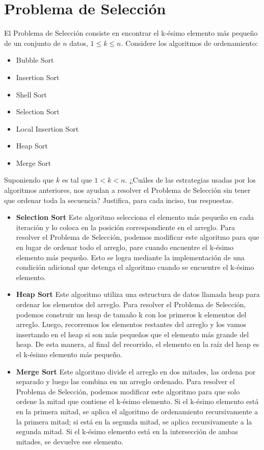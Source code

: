 \section{Problema de Selección}

El Problema de Selección consiste en encontrar el k-ésimo elemento más
pequeño de un conjunto de $n$ datos, $1 \leq k \leq n$.
Considere los algoritmos de ordenamiento:

\begin{itemize}
  \item Bubble Sort
  \item Insertion Sort
  \item Shell Sort
  \item Selection Sort
  \item Local Insertion Sort
  \item Heap Sort
  \item Merge Sort
\end{itemize}

Suponiendo que $k$ es tal que $1 < k < n$. ¿Cuáles de las
estrategias usadas por los algoritmos anteriores, nos ayudan a resolver
el Problema de Selección sin tener que ordenar toda la secuencia?
Justifica, para cada inciso, tus respuestas.

\begin{itemize}
  \item \textbf{Selection Sort} Este algoritmo selecciona el elemento más pequeño en cada iteración y lo coloca en la posición correspondiente en el arreglo. Para resolver el Problema de Selección, podemos modificar este algoritmo para que en lugar de ordenar todo el arreglo, pare cuando encuentre el k-ésimo elemento más pequeño. Esto se logra mediante la implementación de una condición adicional que detenga el algoritmo cuando se encuentre el k-ésimo elemento.
  \item \textbf{Heap Sort} Este algoritmo utiliza una estructura de datos llamada heap para ordenar los elementos del arreglo. Para resolver el Problema de Selección, podemos construir un heap de tamaño k con los primeros k elementos del arreglo. Luego, recorremos los elementos restantes del arreglo y los vamos insertando en el heap si son más pequeños que el elemento más grande del heap. De esta manera, al final del recorrido, el elemento en la raíz del heap es el k-ésimo elemento más pequeño.
  \item \textbf{Merge Sort} Este algoritmo divide el arreglo en dos mitades, las ordena por separado y luego las combina en un arreglo ordenado. Para resolver el Problema de Selección, podemos modificar este algoritmo para que solo ordene la mitad que contiene el k-ésimo elemento. Si el k-ésimo elemento está en la primera mitad, se aplica el algoritmo de ordenamiento recursivamente a la primera mitad; si está en la segunda mitad, se aplica recursivamente a la segunda mitad. Si el k-ésimo elemento está en la intersección de ambas mitades, se devuelve ese elemento.
\end{itemize}
